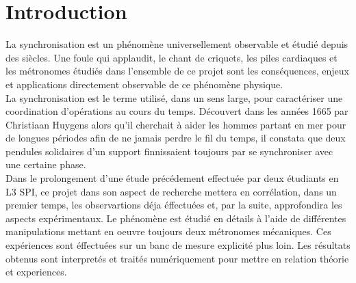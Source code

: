 \documentclass[a4paper,11pt]{report}
\begin{document}
\maketitle %
\newpage
{} \setcounter{page}{1} %
\newpage
\null
\thispagestyle{empty}
\newpage
{\tableofcontents}
\listoffigures
\newpage
\chapter*{Introduction}
 \setcounter{page}{1} %
	La synchronisation est un phénomène universellement observable et étudié depuis des siècles. Une foule qui applaudit, le chant de criquets, les piles cardiaques et les métronomes étudiés dans l'ensemble de ce projet sont les conséquences, enjeux et applications directement observable de ce phénomène physique.\\

	La synchronisation est le terme utilisé, dans un sens large, pour caractériser une coordination d'opérations au cours du temps. Découvert dans les années 1665 par Christiaan Huygens alors qu'il cherchait à aider les hommes partant en mer pour de longues périodes afin de ne jamais perdre le fil du temps, il constata que deux pendules solidaires d'un support finnissaient toujours par se synchroniser avec une certaine phase.\\

	Dans le prolongement d'une étude précédement effectuée par deux étudiants en L3 SPI, ce projet dans son aspect de recherche mettera en corrélation, dans un premier temps, les observartions déja éffectuées et, par la suite, approfondira les aspects expérimentaux. Le phénomène est étudié en détails à l'aide de différentes manipulations mettant en oeuvre toujours deux métronomes mécaniques. Ces expériences sont éffectuées sur un banc de mesure explicité plus loin. Les résultats obtenus sont interpretés et traités numériquement pour mettre en relation théorie et experiences.
\end{document}
